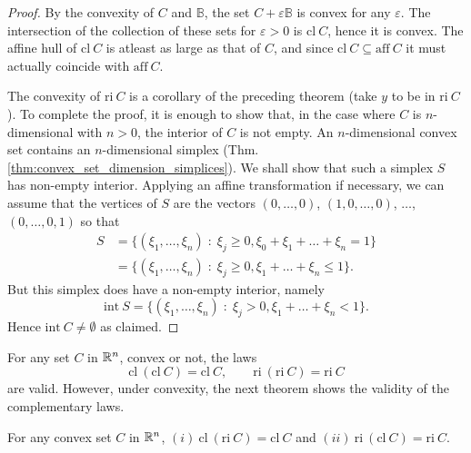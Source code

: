 \documentclass[11pt,a4paper]{article}
\begin{document}
\begin{proof}
    By the convexity of $C$ and $\mathbb{B}$, the set $C+\varepsilon\mathbb{B}$ is convex for any $\varepsilon$. The intersection of the collection of these sets for $\varepsilon>0$ is $\mathrm{cl}\ C$, hence it is convex. The affine hull of $\mathrm{cl}\ C$ is atleast as large as that of $C$, and since $\mathrm{cl}\ C\subseteq \mathrm{aff}\ C$ it must actually coincide with $\mathrm{aff}\ C$.

    The convexity of $\mathrm{ri}\ C$ is a corollary of the preceding theorem (take $y$ to be in $\mathrm{ri}\ C$). To complete the proof, it is enough to show that, in the case where $C$ is $n$-dimensional with $n>0$, the interior of $C$ is not empty. An $n$-dimensional convex set contains an $n$-dimensional simplex (Thm. \ref{thm:convex_set_dimension_simplices}). We shall show that such a simplex $S$ has non-empty interior. Applying an affine transformation if necessary, we can assume that the vertices of $S$ are the vectors $(0,\ldots,0)$, $(1,0,\ldots, 0)$, $\ldots$, $(0,\ldots, 0, 1)$ so that
    \begin{align*}
        S &= \{(\xi_1,\ldots, \xi_n)\;:\;\xi_{j}\ge 0, \xi_0+\xi_1+\ldots+\xi_n = 1\}\\
        &= \{(\xi_1,\ldots, \xi_n)\;:\;\xi_{j}\ge 0, \xi_1+\ldots+\xi_n \le 1\}.
    \end{align*}
    But this simplex does have a non-empty interior, namely 
    \begin{equation*}
        \mathrm{int}\ S = \{(\xi_1,\ldots, \xi_n)\;:\;\xi_{j}> 0, \xi_1+\ldots+\xi_n < 1\}.
    \end{equation*}
    Hence $\mathrm{int}\ C\neq \emptyset$ as claimed.
\end{proof}

\begin{remark}
    For any set $C$ in $\mathbb{R}^n$, convex or not, the laws
    \begin{equation*}
        \mathrm{cl}\ (\mathrm{cl}\ C) = \mathrm{cl}\ C,\qquad \mathrm{ri}\ (\mathrm{ri}\ C) = \mathrm{ri}\ C
    \end{equation*}
    are valid. However, under convexity, the next theorem shows the validity of the complementary laws.
\end{remark}

\begin{theorem}
    For any convex set $C$ in $\mathbb{R}^n$, $(i)\ \mathrm{cl}\ (\mathrm{ri}\ C) = \mathrm{cl}\ C$ and $(ii)\ \mathrm{ri}\ (\mathrm{cl}\ C) = \mathrm{ri}\ C$.
\end{theorem}
\end{document}
